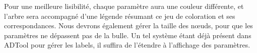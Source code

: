 		Pour une meilleure lisibilité, chaque paramètre aura une couleur différente, et l'arbre sera accompagné d'une légende résumant ce jeu de coloration et ses correspondances. Nous devrons également gérer la taille des nœuds, pour que les paramètres ne dépassent pas de la bulle. Un tel système étant déjà présent dans ADTool pour gérer les labels, il suffira de l'étendre à l'affichage des paramètres.
